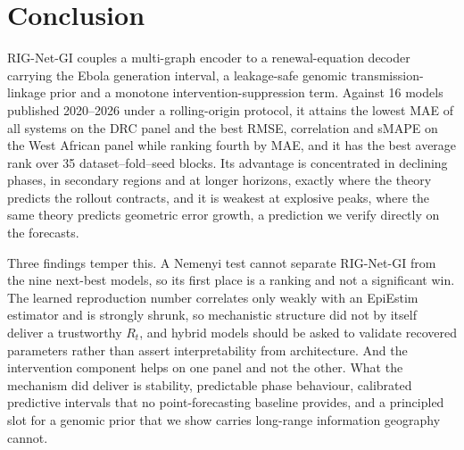 \documentclass[conference]{IEEEtran}
\begin{document}
\section{Conclusion}\label{sec:conclusion}

RIG-Net-GI couples a multi-graph encoder to a renewal-equation decoder carrying the Ebola generation interval, a leakage-safe genomic transmission-linkage prior and a monotone intervention-suppression term. Against 16 models published 2020--2026 under a rolling-origin protocol, it attains the lowest MAE of all systems on the DRC panel and the best RMSE, correlation and sMAPE on the West African panel while ranking fourth by MAE, and it has the best average rank over 35 dataset--fold--seed blocks. Its advantage is concentrated in declining phases, in secondary regions and at longer horizons, exactly where the theory predicts the rollout contracts, and it is weakest at explosive peaks, where the same theory predicts geometric error growth, a prediction we verify directly on the forecasts.

Three findings temper this. A Nemenyi test cannot separate RIG-Net-GI from the nine next-best models, so its first place is a ranking and not a significant win. The learned reproduction number correlates only weakly with an EpiEstim estimator and is strongly shrunk, so mechanistic structure did not by itself deliver a trustworthy $R_t$, and hybrid models should be asked to validate recovered parameters rather than assert interpretability from architecture. And the intervention component helps on one panel and not the other. What the mechanism did deliver is stability, predictable phase behaviour, calibrated predictive intervals that no point-forecasting baseline provides, and a principled slot for a genomic prior that we show carries long-range information geography cannot.

\FloatBarrier

\end{document}
